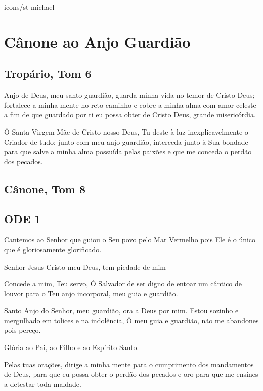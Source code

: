 \documentclass{subfiles}
\begin{document}
\begin{chapterimg}[width=.9\textwidth]{icons/st-michael}
    \chapter{Cânone ao Anjo Guardião}
\end{chapterimg}

\section*{Tropário, Tom 6}

Anjo de Deus, meu santo guardião, guarda minha vida no temor de
Cristo Deus; fortalece a minha mente no reto caminho e cobre a minha alma
com amor celeste a fim de que guardado por ti eu possa obter de Cristo Deus,
grande misericórdia.

\theotokion{}Ó Santa Virgem Mãe de Cristo nosso Deus, Tu deste à luz
inexplicavelmente o Criador de tudo; junto com meu anjo guardião, interceda
junto à Sua bondade para que salve a minha alma possuída pelas paixões e que
me conceda o perdão dos pecados.

\section*{Cânone, Tom 8}

\section*{ODE 1}

\eirmos{}Cantemos ao Senhor que guiou o Seu povo pelo Mar Vermelho pois Ele
é o único que é gloriosamente glorificado.

Senhor Jesus Cristo meu Deus, tem piedade de mim

\textbf{}Concede a mim, Teu servo, Ó Salvador de ser
digno de entoar um cântico de louvor para o Teu anjo incorporal, meu guia e
guardião.

Santo Anjo do Senhor, meu guardião, ora a Deus por mim.
Estou sozinho e mergulhado em tolices e na indolência, Ó meu guia e
guardião, não me abandones pois pereço.

Glória ao Pai, ao Filho e ao Espírito Santo.

Pelas tuas orações, dirige a minha mente para o cumprimento dos
mandamentos de Deus, para que eu possa obter o perdão dos pecados e oro
para que me ensines a detestar toda maldade.
\end{document}

